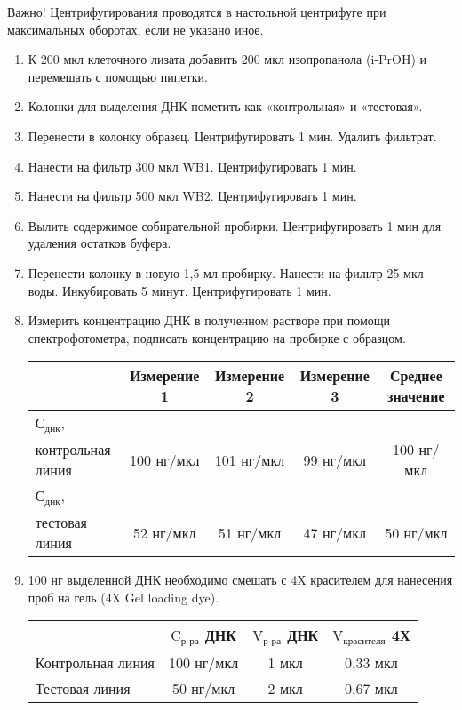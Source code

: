 Важно! Центрифугирования проводятся в настольной центрифуге при максимальных оборотах, если не указано иное.
\begin{enumerate}
\item К 200 мкл клеточного лизата добавить 200 мкл изопропанола (i-PrOH) и перемешать с помощью пипетки.
\item Колонки для выделения ДНК пометить как «контрольная» и «тестовая».
\item Перенести в колонку образец. Центрифугировать 1 мин. Удалить фильтрат.
\item Нанести на фильтр 300 мкл WB1. Центрифугировать 1 мин.
\item Нанести на фильтр 500 мкл WB2. Центрифугировать 1 мин.
\item Вылить содержимое собирательной пробирки. Центрифугировать 1 мин для удаления остатков буфера.
\item Перенести колонку в новую 1,5 мл пробирку. Нанести на фильтр 25 мкл воды. Инкубировать 5 минут. Центрифугировать 1 мин.
\item Измерить концентрацию ДНК в полученном растворе при помощи спектрофотометра, подписать концентрацию на пробирке с образцом.

\begin{tabular}{|l|c|c|c|c|}
    \hline
    & Измерение 1 & Измерение 2 & Измерение 3 & Среднее значение \\
    \hline
    $\text{С}_\text{днк}$,& & & & \\ 
    контрольная линия & 100 нг/мкл & 101 нг/мкл & 99 нг/мкл & 100 нг/мкл \\
    \hline
    $\text{С}_\text{днк}$, & & & & \\ 
    тестовая линия & 52 нг/мкл & 51 нг/мкл & 47 нг/мкл & 50 нг/мкл \\
    \hline
\end{tabular}

\item 100 нг выделенной ДНК необходимо смешать с 4X красителем для нанесения проб на гель (4X Gel loading dye).

\begin{tabular}{|l|c|c|c|}
    \hline
    & $\text{C}_\text{р-ра}$ ДНК & $\text{V}_\text{р-ра}$ ДНК & $\text{V}_\text{красителя}$ 4Х \\
    \hline
    Контрольная линия & 100 нг/мкл & 1 мкл & 0,33 мкл \\
    \hline
    Тестовая линия & 50 нг/мкл & 2 мкл & 0,67 мкл \\
    \hline
\end{tabular}


\end{enumerate}
